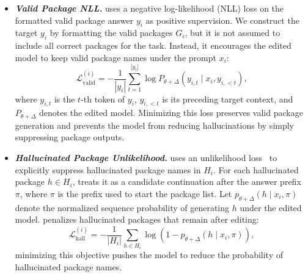 \begin{itemize}[leftmargin=0.5cm]

\item \textbf{\textit{Valid Package NLL.}} \appname uses a negative log-likelihood (NLL) loss on the formatted valid package answer $y_i$ as positive supervision.
We construct the target $y_i$ by formatting the valid packages $G_i$, but it is not assumed to include all correct packages for the task.
Instead, it encourages the edited model to keep valid package names under the prompt $x_i$:
\begin{equation}
    \mathcal{L}_{\mathrm{valid}}^{(i)}
    =
    -
    \frac{1}{|y_i|}
    \sum_{t=1}^{|y_i|}
    \log P_{\theta+\Delta}
    \left(
    y_{i,t}
    \mid
    x_i,y_{i,<t}
    \right),
\end{equation}
where $y_{i,t}$ is the $t$-th token of $y_i$, $y_{i,<t}$ is its preceding target context, and $P_{\theta+\Delta}$ denotes the edited model. Minimizing this loss preserves valid package generation and prevents the model from reducing hallucinations by simply suppressing package outputs.

\item \textbf{\textit{Hallucinated Package Unlikelihood.}} \appname uses an unlikelihood loss~\cite{welleck2019neural} to explicitly suppress hallucinated package names in $H_i$. For each hallucinated package $h \in H_i$, \appname treats it as a candidate continuation after the answer prefix $\pi$, where $\pi$ is the prefix used to start the package list. 
Let $p_{\theta+\Delta}(h \mid x_i,\pi)$ denote the normalized sequence probability of generating $h$ under the edited model. 
\appname penalizes hallucinated packages that remain after editing:
\begin{equation}
    \mathcal{L}_{\mathrm{hall}}^{(i)}
    =
    -
    \frac{1}{|H_i|}
    \sum_{h \in H_i}
    \log
    \left(
    1 -
    p_{\theta+\Delta}(h \mid x_i,\pi)
    \right),
\end{equation}
minimizing this objective pushes the model to reduce the probability of hallucinated package names.


\end{itemize}
